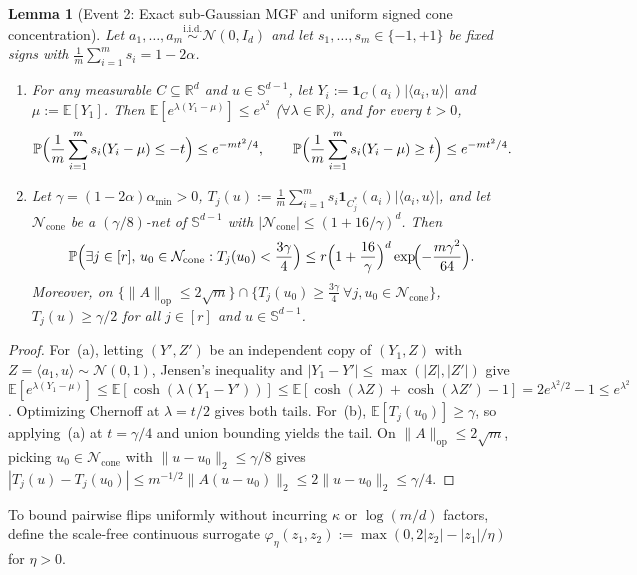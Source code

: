 \documentclass[11pt]{article}
\theoremstyle{plain}
\newtheorem{lemma}[theorem]{Lemma}
\theoremstyle{remark}
\numberwithin{equation}{section}
\newcommand{\R}{\mathbb{R}}
\newcommand{\E}{\mathbb{E}}
\newcommand{\Prob}{\mathbb{P}}
\newcommand{\Sph}{\mathbb{S}}
\newcommand{\ind}{\mathbf{1}}
\newcommand{\ip}[2]{\langle #1, #2 \rangle}
\newcommand{\norm}[1]{\|#1\|}
\newcommand{\opnorm}[1]{\|#1\|_{\mathrm{op}}}
\begin{document}
\begin{lemma}[Event 2: Exact sub-Gaussian MGF and uniform signed cone concentration]
  \label{lem:cone-conc}
  Let $a_1, \dots, a_m \stackrel{\mathrm{i.i.d.}}{\sim} \mathcal{N}(0, I_d)$ and let $s_1, \dots, s_m \in \{-1, +1\}$ be fixed signs with $\frac{1}{m}\sum_{i=1}^m s_i = 1 - 2\alpha$.
  \begin{enumerate}[label=(\alph*)]
    \item For any measurable $C \subseteq \R^d$ and $u \in \Sph^{d-1}$, let $Y_i := \ind_C(a_i)|\ip{a_i}{u}|$ and $\mu := \E[Y_1]$. Then $\E[e^{\lambda(Y_1 - \mu)}] \le e^{\lambda^2}$ ($\forall \lambda \in \R$), and for every $t > 0$,
    \[
      \Prob\Bigl(\frac{1}{m}\sum_{i=1}^m s_i(Y_i - \mu) \le -t\Bigr) \le e^{-mt^2/4},
      \qquad
      \Prob\Bigl(\frac{1}{m}\sum_{i=1}^m s_i(Y_i - \mu) \ge t\Bigr) \le e^{-mt^2/4}.
    \]
    \item Let $\gamma = (1 - 2\alpha)\alpha_{\min} > 0$, $T_j(u) := \frac{1}{m}\sum_{i=1}^m s_i \ind_{C_j^*}(a_i)|\ip{a_i}{u}|$, and let $\mathcal{N}_{\mathrm{cone}}$ be a $(\gamma/8)$-net of $\Sph^{d-1}$ with $|\mathcal{N}_{\mathrm{cone}}| \le (1 + 16/\gamma)^d$. Then
    \[
      \Prob\Bigl(\exists j \in [r],\, u_0 \in \mathcal{N}_{\mathrm{cone}} : T_j(u_0) < \frac{3\gamma}{4}\Bigr)
      \le r\Bigl(1 + \frac{16}{\gamma}\Bigr)^d \exp\!\Bigl(-\frac{m\gamma^2}{64}\Bigr).
    \]
    Moreover, on $\{\opnorm{A} \le 2\sqrt{m}\} \cap \{T_j(u_0) \ge \frac{3\gamma}{4}\ \forall j, u_0 \in \mathcal{N}_{\mathrm{cone}}\}$, $T_j(u) \ge \gamma/2$ for all $j \in [r]$ and $u \in \Sph^{d-1}$.
  \end{enumerate}
\end{lemma}
\begin{proof}
For~(a), letting $(Y', Z')$ be an independent copy of $(Y_1, Z)$ with $Z = \ip{a_1}{u} \sim \mathcal{N}(0, 1)$, Jensen's inequality and $|Y_1 - Y'| \le \max(|Z|, |Z'|)$ give $\E[e^{\lambda(Y_1 - \mu)}] \le \E[\cosh(\lambda(Y_1 - Y'))] \le \E[\cosh(\lambda Z) + \cosh(\lambda Z') - 1] = 2e^{\lambda^2/2} - 1 \le e^{\lambda^2}$. Optimizing Chernoff at $\lambda = t/2$ gives both tails. For~(b), $\E[T_j(u_0)] \ge \gamma$, so applying~(a) at $t = \gamma/4$ and union bounding yields the tail. On $\opnorm{A} \le 2\sqrt{m}$, picking $u_0 \in \mathcal{N}_{\mathrm{cone}}$ with $\norm{u - u_0}_2 \le \gamma/8$ gives $|T_j(u) - T_j(u_0)| \le m^{-1/2}\norm{A(u - u_0)}_2 \le 2\norm{u - u_0}_2 \le \gamma/4$.
\end{proof}

To bound pairwise flips uniformly without incurring $\kappa$ or $\log(m/d)$ factors, define the scale-free continuous surrogate $\varphi_\eta(z_1, z_2) := \max(0, 2|z_2| - |z_1|/\eta)$ for $\eta > 0$.
\end{document}
